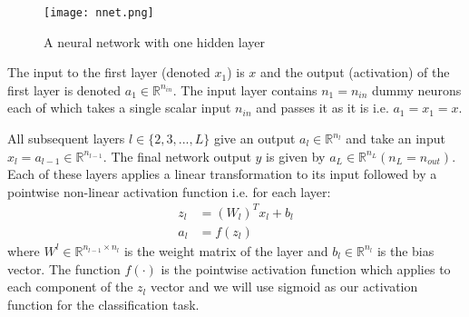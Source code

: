 \begin{figure}[ht]
\begin{center}
\centerline{\texttt{[image: nnet.png]}}
\caption{A neural network with one hidden layer}
\label{fig:nnet}
\end{center}
\vskip -0.2in
\end{figure}

The input to the first layer (denoted $x_1$) is $x$ and the output (activation) of the first layer is denoted $a_1 \in \mathbb{R}^{n_{in}}$. The input layer contains $n_1 = n_{in}$ dummy neurons each of which takes a single scalar input $n_{in}$ and passes it as it is i.e. $a_1 = x_1 = x$.

All subsequent layers $l \in \{2,3,...,L\}$ give an output $a_l \in \mathbb{R}^{n_{l}}$ and take an input $x_l = a_{l-1} \in \mathbb{R}^{n_{l-1}}$. The final network output $y$ is given by $a_L \in \mathbb{R}^{n_L} (n_L = n_{out})$.
Each of these layers applies a linear transformation to its input followed by a pointwise non-linear activation function i.e. for each layer:
\begin{align}
z_l &= (W_l)^T x_l + b_l \\
a_l &= f(z_l)
\end{align}
where $W^l \in \mathbb{R}^{n_{l-1} \times n_l}$ is the weight matrix of the layer and $b_l \in \mathbb{R}^{n_l}$ is the bias vector. The function $f(\cdot)$ is the pointwise activation function which applies to each component of the $z_l$ vector and we will use sigmoid as our activation function for the classification task.
